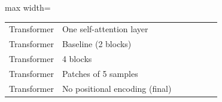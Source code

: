 \begin{table}[htbp]
\begin{adjustbox}{max width=\textwidth}
\begin{tabular}{llrrrrr}
\midrule
Transformer & One self-attention layer & \transformerParamsSaSingle{} & \transformerTokensSaSingle{} & \onedec{\transformerEpochTimeMeanSaSingle} & \onedec{\transformerBestEpochMeanSaSingle} & \onedec{\transformerTrainTimeMinMeanSaSingle} \\
Transformer & Baseline (2 blocks) & \transformerParamsBase{} & \transformerTokensBase{} & \onedec{\transformerEpochTimeMeanBase} & \onedec{\transformerBestEpochMeanBase} & \onedec{\transformerTrainTimeMinMeanBase} \\
Transformer & 4 blocks & \transformerParamsLayersFour{} & \transformerTokensLayersFour{} & \onedec{\transformerEpochTimeMeanLayersFour} & \onedec{\transformerBestEpochMeanLayersFour} & \onedec{\transformerTrainTimeMinMeanLayersFour} \\
Transformer & Patches of 5 samples & \transformerParamsPatchFive{} & \transformerTokensPatchFive{} & \onedec{\transformerEpochTimeMeanPatchFive} & \onedec{\transformerBestEpochMeanPatchFive} & \onedec{\transformerTrainTimeMinMeanPatchFive} \\
Transformer & No positional encoding (final) & \transformerParamsNoPos{} & \transformerTokensNoPos{} & \onedec{\transformerEpochTimeMeanNoPos} & \onedec{\transformerBestEpochMeanNoPos} & \onedec{\transformerTrainTimeMinMeanNoPos} \\
\bottomrule
\end{tabular}
\end{adjustbox}
\end{table}

